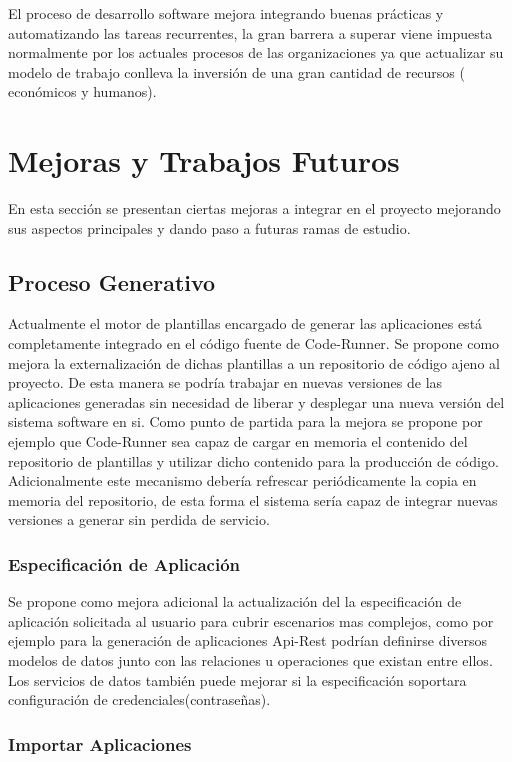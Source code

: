 \documentclass[a4paper,11pt]{book}
\begin{document}
 El proceso de desarrollo software mejora integrando buenas prácticas y automatizando las tareas recurrentes, la gran barrera a superar viene impuesta normalmente por los actuales procesos de las organizaciones ya que actualizar su modelo de trabajo conlleva la inversión de una gran cantidad de recursos ( económicos y humanos).

\section{Mejoras y Trabajos Futuros}

En esta sección se presentan ciertas mejoras a integrar en el proyecto mejorando sus aspectos principales y dando paso a futuras ramas de estudio. 

\subsection{Proceso Generativo}

Actualmente el motor de plantillas encargado de generar las aplicaciones está completamente integrado en el código fuente de Code-Runner. Se propone como mejora la externalización de dichas plantillas a un repositorio de código ajeno al proyecto. De esta manera se podría trabajar en nuevas versiones de las aplicaciones generadas sin necesidad de liberar y desplegar una nueva versión del sistema software en si. Como punto de partida para la mejora se propone por ejemplo que Code-Runner sea capaz de cargar en memoria el contenido del repositorio de plantillas y utilizar dicho contenido para la producción de código. Adicionalmente este mecanismo debería refrescar periódicamente la copia en memoria del repositorio, de esta forma el sistema sería capaz de integrar nuevas versiones a generar sin perdida de servicio. 
\subsubsection{Especificación de Aplicación}

Se propone como mejora adicional la actualización del la especificación de aplicación solicitada al usuario para cubrir escenarios mas complejos, como por ejemplo para la  generación de aplicaciones  Api-Rest podrían definirse diversos modelos de datos junto con las relaciones u operaciones que existan entre ellos. Los servicios de datos también puede mejorar si la especificación soportara configuración de credenciales(contraseñas).

\subsubsection{Importar Aplicaciones}
\end{document}
